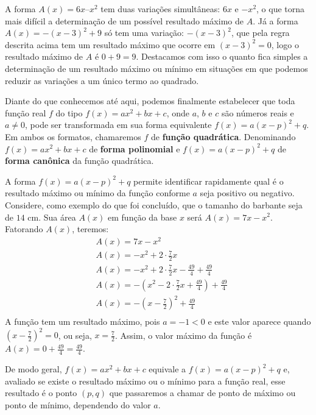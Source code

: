 A forma \(A(x) = 6x – x^2\) tem duas variações simultâneas: \(6x\) e \(-x^2\), o que torna mais difícil a determinação de um possível resultado máximo de \(A\). Já a forma \(A(x)=-(x-3)^2 +9\) só tem uma variação: \(-(x-3)^2\), que pela regra descrita acima tem um resultado máximo que ocorre em \((x-3)^2=0\), logo o resultado máximo de \(A\) é \(0+9=9\). Destacamos com isso o quanto fica simples a determinação de um resultado máximo ou mínimo em situações em que podemos reduzir as variações a um único termo ao quadrado.

Diante do que conhecemos até aqui, podemos finalmente estabelecer que toda função real \(f\) do tipo \(f(x)=ax^{2}+bx+c\), onde \(a\), \(b\) e \(c\) são números reais e \(a \neq 0\), pode ser transformada em sua forma equivalente \(f(x)=a(x-p)^{2}+q\). Em ambos os formatos, chamaremos \(f\) de \textbf{função quadrática}. Denominando \(f(x)=ax^{2}+bx+c\) de \textbf{forma polinomial} e \(f(x)=a(x-p)^{2}+q\) de \textbf{forma canônica} da função quadrática.

A forma \(f(x)=a(x-p)^{2}+q\) permite identificar rapidamente  qual é o resultado máximo ou mínimo da função conforme \(a\) seja positivo ou negativo.
Considere, como exemplo do que foi concluído, que o tamanho do barbante seja de \(14\) cm. Sua área \(A(x)\) em função da base \(x\) será \(A(x)=7x-x^{2}\). Fatorando \(A(x)\), teremos:
\begin{equation*}
\begin{split}& A(x)= 7x-x^{2}\\
& A(x)=-x^{2}+2 \cdot \frac{7}{2}x\\
& A(x)=-x^{2}+2 \cdot \frac{7}{2}x - \frac{49}{4} + \frac{49}{4}\\
& A(x)=-\left(x^{2}-2 \cdot \frac{7}{2}x + \frac{49}{4}\right) + \frac{49}{4}\\
& A(x)=- \left(x - \frac{7}{2} \right )^{2}+ \frac{49}{4}\\\end{split}
\end{equation*}
A função tem um resultado máximo, pois \(a=-1<0\) e este valor aparece quando \(\displaystyle\left(x-\frac{7}{2}\right)^{2}=0\), ou seja, \(x=\frac{7}{2}\). Assim, o valor máximo da função é \(\displaystyle A(x)=0+\frac{49}{4}=\frac{49}{4}\).

De modo geral, \(f(x)=ax^{2}+bx+c\) equivale a \(f(x)=a(x-p)^{2}+q\) e, avaliado se existe o resultado máximo ou o mínimo para a função real, esse resultado é o ponto \((p,q)\) que passaremos a chamar de ponto de máximo ou ponto de mínimo, dependendo do valor \(a\).

